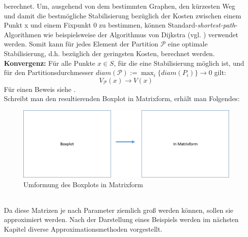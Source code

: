 \documentclass[12pt,a4paper,twoside]{article}
\begin{document}
	berechnet. \newline
	\newline
	Um, ausgehend von dem bestimmten Graphen, den kürzesten Weg und damit die bestmögliche Stabilisierung bezüglich 
	der Kosten zwischen einem Punkt x und einem Fixpunkt $0$ zu bestimmen, können Standard-\textit{shortest-path}-Algorithmen wie beispielsweise der Algorithmus von Dijkstra (vgl. \citep{Dijkstra59}) verwendet werden.
	\newline
	Somit kann für jedes Element der Partition $\mathcal{P}$ eine optimale Stabilisierung, d.h. bezüglich der geringsten Kosten, berechnet werden. \newline
	\newline
	\textbf{Konvergenz:} Für alle Punkte $x\in S$, für die eine Stabilisierung möglich ist, und für den Partitionsdurchmesser $diam(\mathcal{P}):=\max_i\{diam(P_i)\}\rightarrow 0$ gilt:
	\begin{equation*}
		V_\mathcal{P}(x)\rightarrow V(x)
	\end{equation*}
	Für einen Beweis siehe \cite{Junge2004}. \\
	Schreibt man den resultierenden Boxplot in Matrixform, erhält man Folgendes: \\
	\begin{figure}[h]
		\includegraphics[scale=0.5]{testbild}
		\caption{Umformung des Boxplots in Matrixform}
	\end{figure}
	\\
	Da diese Matrizen je nach Parameter ziemlich groß werden können, sollen sie approximiert werden. Nach der Darstellung eines Beispiels werden im nächsten 
	Kapitel diverse Approximationsmethoden vorgestellt.
\end{document}
